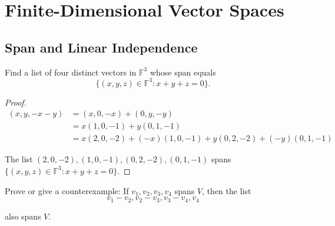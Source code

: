 \chapter{Finite-Dimensional Vector Spaces}

\section{Span and Linear Independence}

\begin{exercise}
    Find a list of four distinct vectors in $\mathbb{F}^{3}$ whose span equals
    \[
        \{ (x, y, z)\in \mathbb{F}^{3}: x + y + z = 0 \}.
    \]
\end{exercise}

\begin{proof}
    \begin{align*}
        (x, y, -x-y) & = (x, 0, -x) + (0, y, -y)                                     \\
                     & = x(1, 0, -1) + y(0, 1, -1)                                   \\
                     & = x(2, 0, -2) + (-x)(1, 0, -1) + y(0, 2, -2) + (-y)(0, 1, -1)
    \end{align*}

    The list $(2, 0, -2), (1, 0, -1), (0, 2, -2), (0, 1, -1)$ spans $\{ (x, y, z)\in\mathbb{F}^{3}: x + y + z = 0 \}$.
\end{proof}

\begin{exercise}
    Prove or give a counterexample: If $v_{1}, v_{2}, v_{3}, v_{4}$ spans $V$, then the list
    \[
        v_{1} - v_{2}, v_{2} - v_{3}, v_{3} - v_{4}, v_{4}
    \]

    also spans $V$.
\end{exercise}

